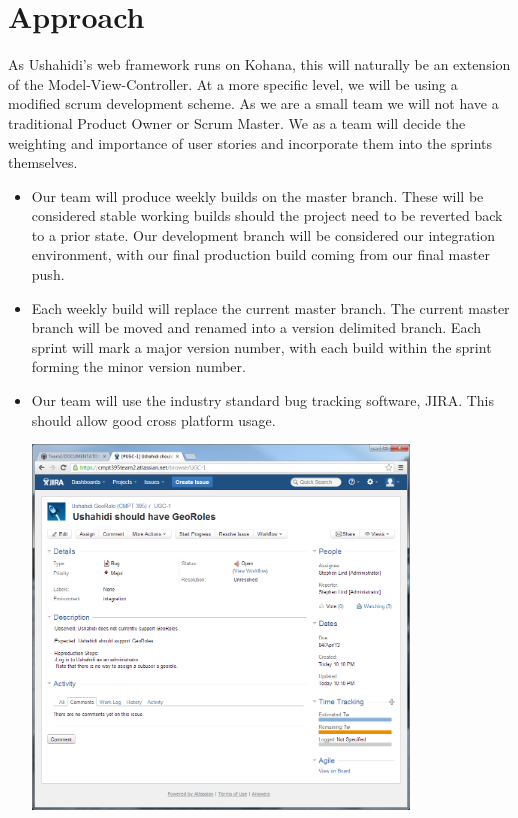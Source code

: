 \documentclass{article}
\begin{document}
\section{Approach}
As Ushahidi's web framework runs on Kohana, this will naturally be an extension of the Model-View-Controller. At a more specific level, we will be using a modified scrum development scheme. As we are a small team we will not have a traditional Product Owner or Scrum Master. We as a team will decide the weighting and importance of user stories and incorporate them into the sprints themselves.
\begin{itemize}
  \item Our team will produce weekly builds on the master branch. These will be considered stable working builds should the project need to be reverted back to a prior state. Our development branch will be considered our integration environment, with our final production build coming from our final master push.
    \item Each weekly build will replace the current master branch. The current master branch will be moved and renamed into a version delimited branch. Each sprint will mark a major version number, with each build within the sprint forming the minor version number.
      \item Our team will use the industry standard bug tracking software, JIRA. This should allow good cross platform usage.\\
\begin{minipage}{\linewidth}
  \centering
  \includegraphics[width=100mm]{JIRAbug.png}
\end{minipage}
\end{itemize}
        
\end{document}
